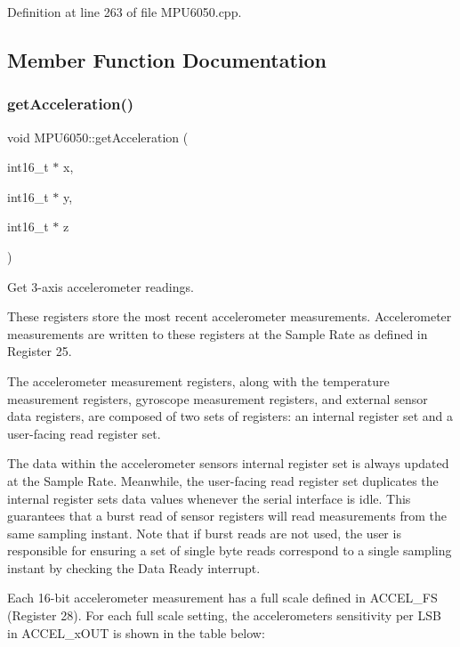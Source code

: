 Definition at line 263 of file M\+P\+U6050.\+cpp.



\subsection{Member Function Documentation}
\mbox{\label{classMPU6050_a658dfc7e35b7fdba360a75f137bde33a}} 
\subsubsection{\texorpdfstring{getAcceleration()}{getAcceleration()}}
{\footnotesize\ttfamily void M\+P\+U6050\+::get\+Acceleration (\begin{DoxyParamCaption}\item[{int16\+\_\+t $\ast$}]{x,  }\item[{int16\+\_\+t $\ast$}]{y,  }\item[{int16\+\_\+t $\ast$}]{z }\end{DoxyParamCaption})}



Get 3-\/axis accelerometer readings. 

These registers store the most recent accelerometer measurements. Accelerometer measurements are written to these registers at the Sample Rate as defined in Register 25.

The accelerometer measurement registers, along with the temperature measurement registers, gyroscope measurement registers, and external sensor data registers, are composed of two sets of registers\+: an internal register set and a user-\/facing read register set.

The data within the accelerometer sensors\textquotesingle{} internal register set is always updated at the Sample Rate. Meanwhile, the user-\/facing read register set duplicates the internal register set\textquotesingle{}s data values whenever the serial interface is idle. This guarantees that a burst read of sensor registers will read measurements from the same sampling instant. Note that if burst reads are not used, the user is responsible for ensuring a set of single byte reads correspond to a single sampling instant by checking the Data Ready interrupt.

Each 16-\/bit accelerometer measurement has a full scale defined in A\+C\+C\+E\+L\+\_\+\+FS (Register 28). For each full scale setting, the accelerometers\textquotesingle{} sensitivity per L\+SB in A\+C\+C\+E\+L\+\_\+x\+O\+UT is shown in the table below\+:


